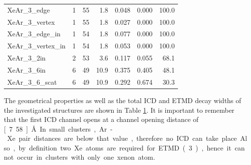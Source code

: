 \begin{table}[h]
\begin{tabular}{lrrrccr}
XeAr\_3\_edge        &      1   &     55   &  1.8  & 0.048 & 0.000 & 100.0\\ %
XeAr\_3\_vertex      &      1   &     55   &  1.8  & 0.027 & 0.000 & 100.0\\ %
XeAr\_3\_edge\_in    &      1   &     54   &  1.8  & 0.077 & 0.000 & 100.0\\ %
XeAr\_3\_vertex\_in  &      1   &     54   &  1.8  & 0.053 & 0.000 & 100.0\\ %
XeAr\_3\_2in         &      2   &     53   &  3.6  & 0.117 & 0.055 &  68.1\\ %
XeAr\_3\_6in         &      6   &     49   & 10.9  & 0.375 & 0.405 &  48.1\\ %
XeAr\_3\_6\_scat     &      6   &     49   & 10.9  & 0.292 & 0.674 &  30.3\\ %
\bottomrule
\end{tabular}
\label{table:theo_gammas}
\end{table}
%
The geometrical properties as well as the total ICD and ETMD decay widths
of the investigated structures are shown in Table \ref{table:theo_gammas}.
It is important to remember that the first ICD channel opens at a
channel opening distance of \unit[7.58]{\AA}. In small
clusters, Ar-Xe pair distances are below that value, therefore 
no ICD can take place. Also, by definition two Xe atoms are
required for ETMD(3), hence it cannot occur in clusters with only one xenon atom.
%
